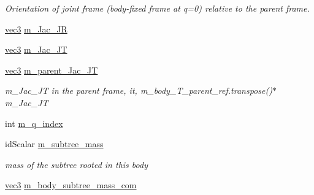 \begin{CompactItemize}
\begin{CompactList}\small\item\em Orientation of joint frame (body-fixed frame at q=0) relative to the parent frame. \item\end{CompactList}\item 
\hyperlink{classbt_inverse_dynamics_1_1vec3}{vec3} \hyperlink{structbt_inverse_dynamics_1_1_rigid_body_5ce5299988e53be540fa03c23b8bb63e}{m\_\-Jac\_\-JR}
\item 
\hyperlink{classbt_inverse_dynamics_1_1vec3}{vec3} \hyperlink{structbt_inverse_dynamics_1_1_rigid_body_cedf67bbb73601a34c2909136fae1187}{m\_\-Jac\_\-JT}
\item 
\hypertarget{structbt_inverse_dynamics_1_1_rigid_body_611f676adae686400eb0e080b63450f5}{
\hyperlink{classbt_inverse_dynamics_1_1vec3}{vec3} \hyperlink{structbt_inverse_dynamics_1_1_rigid_body_611f676adae686400eb0e080b63450f5}{m\_\-parent\_\-Jac\_\-JT}}
\label{structbt_inverse_dynamics_1_1_rigid_body_611f676adae686400eb0e080b63450f5}

\begin{CompactList}\small\item\em m\_\-Jac\_\-JT in the parent frame, it, m\_\-body\_\-T\_\-parent\_\-ref.transpose()$\ast$m\_\-Jac\_\-JT \item\end{CompactList}\item 
int \hyperlink{structbt_inverse_dynamics_1_1_rigid_body_33784734bb817b0f117e5cc59f8e2d07}{m\_\-q\_\-index}
\item 
\hypertarget{structbt_inverse_dynamics_1_1_rigid_body_373da26934541537bcd9037f47502b5d}{
idScalar \hyperlink{structbt_inverse_dynamics_1_1_rigid_body_373da26934541537bcd9037f47502b5d}{m\_\-subtree\_\-mass}}
\label{structbt_inverse_dynamics_1_1_rigid_body_373da26934541537bcd9037f47502b5d}

\begin{CompactList}\small\item\em mass of the subtree rooted in this body \item\end{CompactList}\item 
\hypertarget{structbt_inverse_dynamics_1_1_rigid_body_9e35e44f0444659a3b67aa6ac4e06a2e}{
\hyperlink{classbt_inverse_dynamics_1_1vec3}{vec3} \hyperlink{structbt_inverse_dynamics_1_1_rigid_body_9e35e44f0444659a3b67aa6ac4e06a2e}{m\_\-body\_\-subtree\_\-mass\_\-com}}
\label{structbt_inverse_dynamics_1_1_rigid_body_9e35e44f0444659a3b67aa6ac4e06a2e}


\end{CompactItemize}
